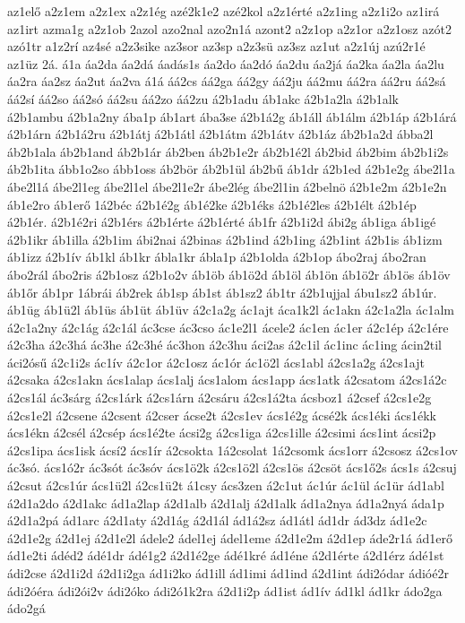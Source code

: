 {az1elő
a2z1em
a2z1ex
a2z1ég
azé2k1e2
azé2kol
a2z1érté
a2z1ing
a2z1i2o
az1irá
az1irt
azma1g
a2z1ob
2azol
azo2nal
azo2n1á
azont2
a2z1op
a2z1or
a2z1osz
azót2
azó1tr
a1z2rí
az4sé
a2z3sike
az3sor
az3sp
a2z3sü
az3sz
az1ut
a2z1új
azú2r1é
az1üz
2á.
á1a
áa2da
áa2dá
áadás1s
áa2do
áa2dó
áa2du
áa2já
áa2ka
áa2la
áa2lu
áa2ra
áa2sz
áa2ut
áa2va
á1á
áá2cs
áá2ga
áá2gy
áá2ju
áá2mu
áá2ra
áá2ru
áá2sá
áá2sí
áá2so
áá2só
áá2su
áá2zo
áá2zu
á2b1adu
áb1akc
á2b1a2la
á2b1alk
á2b1ambu
á2b1a2ny
ába1p
áb1art
ába3se
á2b1á2g
áb1áll
áb1álm
á2b1áp
á2b1árá
á2b1árn
á2b1á2ru
á2b1átj
á2b1átl
á2b1átm
á2b1átv
á2b1áz
áb2b1a2d
ábba2l
áb2b1ala
áb2b1and
áb2b1ár
áb2ben
áb2b1e2r
áb2b1é2l
áb2bid
áb2bim
áb2b1i2s
áb2b1ita
ább1o2so
ább1oss
áb2bör
áb2b1ül
áb2bű
áb1dr
á2b1ed
á2b1e2g
ábe2l1a
ábe2l1á
ábe2l1eg
ábe2l1el
ábe2l1e2r
ábe2lég
ábe2l1in
á2belnö
á2b1e2m
á2b1e2n
áb1e2ro
áb1erő
1á2béc
á2b1é2g
áb1é2ke
á2b1éks
á2b1é2les
á2b1élt
á2b1ép
á2b1ér.
á2b1é2ri
á2b1érs
á2b1érte
á2b1érté
áb1fr
á2b1i2d
ábi2g
áb1iga
áb1igé
á2b1ikr
áb1illa
á2b1im
ábi2nai
á2binas
á2b1ind
á2b1ing
á2b1int
á2b1is
áb1izm
áb1izz
á2b1ív
áb1kl
áb1kr
ábla1kr
ábla1p
á2b1olda
á2b1op
ábo2raj
ábo2ran
ábo2rál
ábo2ris
á2b1osz
á2b1o2v
áb1öb
áb1ö2d
áb1öl
áb1ön
áb1ö2r
áb1ös
áb1öv
áb1őr
áb1pr
1ábrái
áb2rek
áb1sp
áb1st
áb1sz2
áb1tr
á2b1ujjal
ábu1sz2
áb1úr.
áb1üg
áb1ü2l
áb1üs
áb1üt
áb1üv
á2c1a2g
ác1ajt
áca1k2l
ác1akn
á2c1a2la
ác1alm
á2c1a2ny
á2c1ág
á2c1ál
ác3cse
ác3cso
ác1e2l1
ácele2
ác1en
ác1er
á2c1ép
á2c1ére
á2c3ha
á2c3há
ác3he
á2c3hé
ác3hon
á2c3hu
áci2as
á2c1il
ác1inc
ác1ing
ácin2til
áci2ósű
á2c1i2s
ác1ív
á2c1or
á2c1osz
ác1ór
ác1ö2l
ács1abl
á2cs1a2g
á2cs1ajt
á2csaka
á2cs1akn
ács1alap
ács1alj
ács1alom
ács1app
ács1atk
á2csatom
á2cs1á2c
á2cs1ál
ác3sárg
á2cs1árk
á2cs1árn
á2csáru
á2cs1á2ta
ácsboz1
á2csef
á2cs1e2g
á2cs1e2l
á2csene
á2csent
á2cser
ácse2t
á2cs1ev
ács1é2g
ácsé2k
ács1éki
ács1ékk
ács1ékn
á2csél
á2csép
ács1é2te
ácsi2g
á2cs1iga
á2cs1ille
á2csimi
ács1int
ácsi2p
á2cs1ipa
ács1isk
ácsí2
ács1ír
á2csokta
1á2csolat
1á2csomk
ács1orr
á2csosz
á2cs1ov
ác3só.
ács1ó2r
ác3sót
ác3sóv
ács1ö2k
á2cs1ö2l
á2cs1ös
á2csöt
ács1ő2s
ács1s
á2csuj
á2csut
á2cs1úr
ács1ü2l
á2cs1ü2t
á1csy
ács3zen
á2c1ut
ác1úr
ác1ül
ác1ür
ád1abl
á2d1a2do
á2d1akc
ád1a2lap
á2d1alb
á2d1alj
á2d1alk
ád1a2nya
ád1a2nyá
áda1p
á2d1a2pá
ád1arc
á2d1aty
á2d1ág
á2d1ál
ád1á2sz
ád1átl
ád1dr
ád3dz
ád1e2c
á2d1e2g
á2d1ej
á2d1e2l
ádele2
ádel1ej
ádel1eme
á2d1e2m
á2d1ep
áde2r1á
ád1erő
ád1e2ti
ádéd2
ádé1dr
ádé1g2
á2d1é2ge
ádé1kré
ád1éne
á2d1érte
á2d1érz
ádé1st
ádi2cse
á2d1i2d
á2d1i2ga
ád1i2ko
ád1ill
ád1imi
ád1ind
á2d1int
ádi2ódar
ádióé2r
ádi2óéra
ádi2ói2v
ádi2óko
ádi2ó1k2ra
á2d1i2p
ád1ist
ád1ív
ád1kl
ád1kr
ádo2ga
ádo2gá
}
